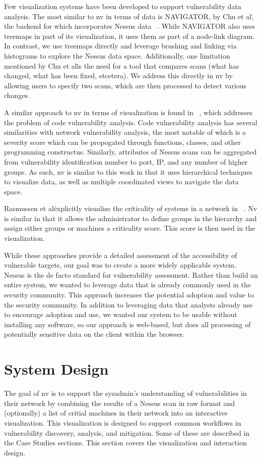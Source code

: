 \documentclass{acm_proc_article-sp}
\begin{document}
Few visualization systems have been developed to support vulnerability data analysis. 
The most similar to nv in terms of data is NAVIGATOR, by Chu et al\., the backend for which incorporates Nessus data ~\cite{Chu:2010wx}.
While NAVIGATOR also uses treemaps in part of its visualization, it uses them as part of a node-link diagram. 
In contrast, we use treemaps directly and leverage brushing and linking via histograms to explore the Nessus data space.
Additionally, one limitation mentioned by Chu et al\. is the need for a tool that compares scans (what has changed, what has been fixed, etcetera). 
We address this directly in nv by allowing users to specify two scans, which are then processed to detect various changes.

A similar approach to nv in terms of visualization is found in ~\cite{Goodall:2010vi}, which addresses the problem of code vulnerability analysis. Code vulnerability analysis has several similarities with network vulnerability analysis, the most notable of which is a severity score which can be propogated through functions, classes, and other programming constructus. Similarly, attributes of Nessus scans can be aggregated from vulnerability identification number to port, IP, and any number of higher groups. As such, nv is similar to this work in that it uses hierarchical techniques to visualize data, as well as multiple coordinated views to navigate the data space.   

Rasmussen et al\. explicitly visualize the criticality of systems in a network in ~\cite{Rasmussen:2010th}. Nv is similar in that it allows the administrator to define groups in the hierarchy and assign either groups or machines a criticality score. This score is then used in the visualization. 

While these approaches provide a detailed assessment of the accessibility of vulnerable targets, our goal was to create a more widely applicable system. Nessus is the de facto standard for vulnerability assessment. Rather than build an entire system, we wanted to leverage data that is already commonly used in the security community. This approach increases the potential adoption and value to the security community. In addition to leveraging data that analysts already use to encourage adoption and use, we wanted our system to be usable without installing any software, so our approach is web-based, but does all processing of potentially sensitive data on the client within the browser.

\section{System Design}
The goal of nv is to support the sysadmin's understanding of vulnerabilities in their network by combining the results of a Nessus scan in raw format and (optionally) a list of critial machines in their network into an interactive visualization.
This visualization is designed to support common workflows in vulnerability discovery, analysis, and mitigation.
Some of these are described in the Case Studies sections.
This section covers the visualization and interaction design.
\end{document}
